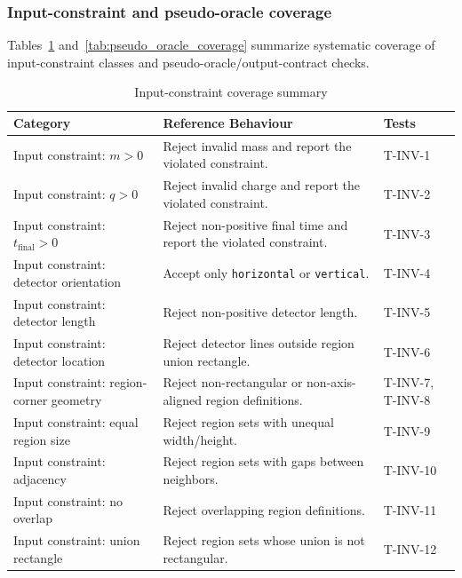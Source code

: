 \documentclass[12pt, titlepage]{article}
\begin{document}
\subsubsection{Input-constraint and pseudo-oracle coverage}

Tables~\ref{tab:input_constraint_coverage}
and~\ref{tab:pseudo_oracle_coverage} summarize systematic coverage of
input-constraint classes and pseudo-oracle/output-contract checks.

\begin{table}[h!]
\centering
\renewcommand{\arraystretch}{1.15}
\begin{tabularx}{\textwidth}{p{3.8cm}p{6.2cm}X}
\toprule
\textbf{Category} & \textbf{Reference Behaviour} & \textbf{Tests} \\
\midrule
Input constraint: $m>0$ & Reject invalid mass and report the violated constraint. & T-INV-1 \\
Input constraint: $q>0$ & Reject invalid charge and report the violated constraint. & T-INV-2 \\
Input constraint: $t_{\text{final}}>0$ & Reject non-positive final time and report the violated constraint. & T-INV-3 \\
Input constraint: detector orientation & Accept only \texttt{horizontal} or \texttt{vertical}. & T-INV-4 \\
Input constraint: detector length & Reject non-positive detector length. & T-INV-5 \\
Input constraint: detector location & Reject detector lines outside region union rectangle. & T-INV-6 \\
Input constraint: region-corner geometry & Reject non-rectangular or non-axis-aligned region definitions. & T-INV-7, T-INV-8 \\
Input constraint: equal region size & Reject region sets with unequal width/height. & T-INV-9 \\
Input constraint: adjacency & Reject region sets with gaps between neighbors. & T-INV-10 \\
Input constraint: no overlap & Reject overlapping region definitions. & T-INV-11 \\
Input constraint: union rectangle & Reject region sets whose union is not rectangular. & T-INV-12 \\
\bottomrule
\end{tabularx}
\caption{Input-constraint coverage summary}
\label{tab:input_constraint_coverage}
\end{table}
\end{document}
